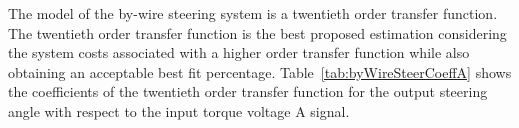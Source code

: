 \documentclass[journal,twoside,web]{ieeecolor}
\begin{document}
\vspace{12pt}
\noindent The model of the by-wire steering system is a twentieth order transfer function. The twentieth order transfer function is the best proposed estimation considering the system costs associated with a higher order transfer function while also obtaining an acceptable best fit percentage. Table~\ref{tab:byWireSteerCoeffA} shows the coefficients of the twentieth order transfer function for the output steering angle with respect to the input torque voltage A signal.%
%
\begin{table}[hbtp]
	\label{tab:byWireSteerCoeffA}
	\caption{By-Wire Mode Steering Transfer Function Torque Voltage A Coefficient Table}
  \centering
    
	\begin{center}
	\end{center}	
\end{table}
%
 
\end{document}
